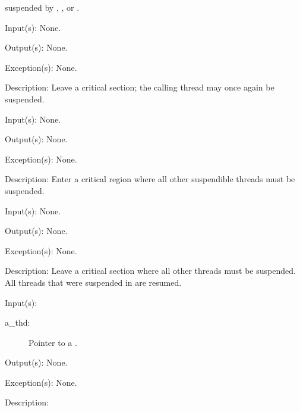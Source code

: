\begin{capi}
\begin{capilist}
		suspended by , ,
		or .
	\end{capilist}
\label{thd_crit_leave}
	\begin{capilist}
	\item[Input(s): ] None.
	\item[Output(s): ] None.
	\item[Exception(s): ] None.
	\item[Description: ]
		Leave a critical section; the calling thread may once again be
		suspended.
	\end{capilist}
\label{thd_single_enter}
	\begin{capilist}
	\item[Input(s): ] None.
	\item[Output(s): ] None.
	\item[Exception(s): ] None.
	\item[Description: ]
		Enter a critical region where all other suspendible threads must
		be suspended.
	\end{capilist}
\label{thd_single_leave}
	\begin{capilist}
	\item[Input(s): ] None.
	\item[Output(s): ] None.
	\item[Exception(s): ] None.
	\item[Description: ]
		Leave a critical section where all other threads must be
		suspended.  All threads that were suspended in
		 are resumed.
	\end{capilist}
\label{thd_suspend}
	\begin{capilist}
	\item[Input(s): ]
		\begin{description}\item[]
		\item[a\_thd: ]
			Pointer to a \classname{thd}.
		\end{description}
	\item[Output(s): ] None.
	\item[Exception(s): ] None.
	\item[Description: ]

\end{capilist}
\end{capi}
